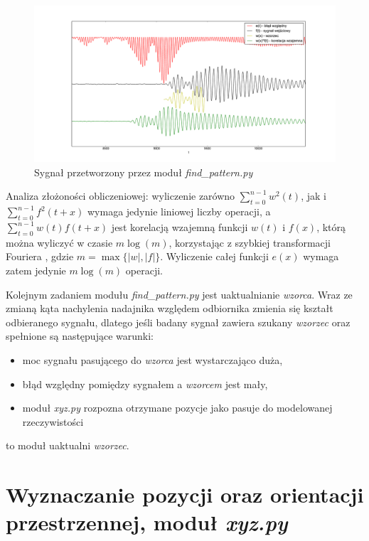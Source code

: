 \begin{figure}[h!]
    \centering
    \includegraphics[width=1.13\textwidth, trim= 53mm 0mm 0mm 0mm,clip]{blad_korel}
    \caption{Sygnał przetworzony przez moduł \textit{find\_pattern.py}}
    \label{fig:blad_korel}
\end{figure}
 
 
 Analiza złożoności obliczeniowej: wyliczenie zarówno $ \sum\limits_{t=0}^{n-1}  w^2(t) $,
jak i $\sum\limits_{t=0}^{n-1} f^2(t+x)$ wymaga jedynie liniowej liczby operacji, a 
 $\sum\limits_{t=0}^{n-1}  w(t) f(t+x) $ jest korelacją wzajemną funkcji $w(t)$ i $f(x)$, którą
 można wyliczyć w czasie $m \log(m)$, korzystając z szybkiej transformacji Fouriera \cite{bib:FFT_correlation},
 gdzie $m = \max \{|w|, |f| \}$. Wyliczenie całej funkcji $e(x)$ wymaga zatem jedynie $m \log(m)$ operacji.

 
 Kolejnym zadaniem modułu \textit{find\_pattern.py} jest uaktualnianie \textit{wzorca}.
 Wraz ze zmianą kąta nachylenia nadajnika względem odbiornika zmienia się kształt odbieranego sygnału,
 dlatego jeśli badany sygnał zawiera szukany \textit{wzorzec} oraz spełnione są następujące warunki:
 \begin{itemize}
  \item moc sygnału pasującego do \textit{wzorca} jest wystarczająco duża,
  \item błąd względny pomiędzy sygnałem a \textit{wzorcem} jest mały,
  \item moduł \textit{xyz.py} rozpozna otrzymane pozycje jako pasuje do modelowanej rzeczywistości
 \end{itemize}
to moduł uaktualni \textit{wzorzec}.
 
 
\section{Wyznaczanie pozycji oraz orientacji przestrzennej, moduł \textit{xyz.py}}

